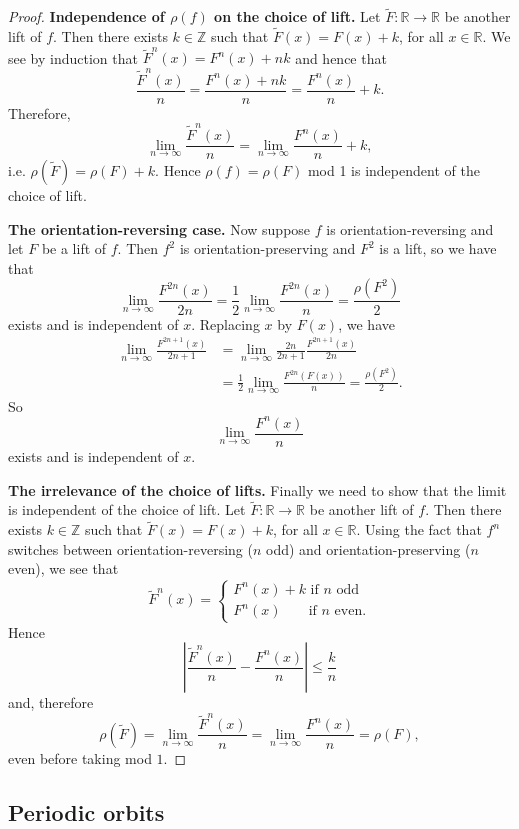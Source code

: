 \documentclass[12pt]{article}
\theoremstyle{definition}
\theoremstyle{remark}
\begin{document}
\begin{proof}
\medskip
\noindent
{\bf Independence of $\rho(f)$ on the choice of lift.}
Let $\tilde F : \mathbb R \to \mathbb R$ be another lift of $f$. Then there exists $k \in \mathbb Z$ such that
$\tilde F(x) = F(x)+k$, for all $x \in \mathbb R$.
We see by induction that
$\tilde F^n(x) = F^n(x)+nk$
and hence that
\[
\frac{\tilde F^n(x)}{n}= \frac{F^n(x)+nk}{n}
= \frac{F^n(x)}{n} +k.
\]
Therefore,
\[
\lim_{n \to \infty} \frac{\tilde F^n(x)}{n}
= \lim_{n \to \infty} \frac{F^n(x)}{n} +k,
\]
i.e. $\rho(\tilde F)=\rho(F) + k$. Hence $\rho(f)=\rho(F)$ mod 1 is independent of the choice of lift.

\medskip
\noindent
{\bf The orientation-reversing case.}
Now suppose $f$ is orientation-reversing and let $F$ be a lift of $f$. Then $f^2$ is orientation-preserving and $F^2$ is a lift, so we have that
\[
\lim_{n \to \infty} \frac{F^{2n}(x)}{2n} = \frac{1}{2}\lim_{n \to \infty} \frac{F^{2n}(x)}{n}
= \frac{\rho(F^2)}{2}
\]
exists and is independent of $x$.
Replacing $x$ by $F(x)$, we have
\begin{align*}
\lim_{n \to \infty} \frac{F^{2n+1}(x)}{2n+1} &= \lim_{n \to \infty} \frac{2n}{2n+1}\frac{F^{2n+1}(x)}{2n}
\\
&=
\frac{1}{2}\lim_{n \to \infty} \frac{F^{2n}(F(x))}{n} = \frac{\rho(F^2)}{2}.
\end{align*}
So 
\[
\lim_{n \to \infty} \frac{F^n(x)}{n}
\]
exists and is independent of $x$.

\medskip
\noindent
{\bf The irrelevance of the choice of lifts.}
Finally we need to show that the limit is independent of the choice of lift.
Let $\tilde F : \mathbb R \to \mathbb R$ be another lift of $f$. Then there exists $k \in \mathbb Z$ such that
$\tilde F(x) = F(x)+k$, for all $x \in \mathbb R$.
Using the fact that $f^n$ switches between orientation-reversing ($n$ odd) and orientation-preserving ($n$ even), we see that
\[
\tilde F^n(x) = \begin{cases} F^n(x)+k \mbox{ if } n \mbox{ odd} \\
F^n(x) \quad \ \ \, \mbox{ if } n \mbox{ even}.
\end{cases}
\]
Hence
\[
\left|\frac{\tilde F^n(x)}{n}-
\frac{F^n(x)}{n}\right| \le \frac{k}{n}
\]
and, therefore
\[
\rho(\tilde F)=\lim_{n \to \infty} \frac{\tilde F^n(x)}{n}
= \lim_{n \to \infty} \frac{F^n(x)}{n} = \rho(F),
\]
even before taking mod $1$.
\end{proof}

\subsection{Periodic orbits}
\end{document}
